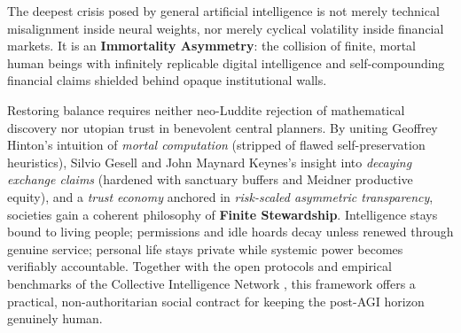 \documentclass[11pt]{article}
\begin{document}
The deepest crisis posed by general artificial intelligence is not merely technical misalignment inside neural weights, nor merely cyclical volatility inside financial markets. It is an \textbf{Immortality Asymmetry}: the collision of finite, mortal human beings with infinitely replicable digital intelligence and self-compounding financial claims shielded behind opaque institutional walls.

Restoring balance requires neither neo-Luddite rejection of mathematical discovery nor utopian trust in benevolent central planners. By uniting Geoffrey Hinton's intuition of \emph{mortal computation} (stripped of flawed self-preservation heuristics), Silvio Gesell and John Maynard Keynes's insight into \emph{decaying exchange claims} (hardened with sanctuary buffers and Meidner productive equity), and a \emph{trust economy} anchored in \emph{risk-scaled asymmetric transparency}, societies gain a coherent philosophy of \textbf{Finite Stewardship}. Intelligence stays bound to living people; permissions and idle hoards decay unless renewed through genuine service; personal life stays private while systemic power becomes verifiably accountable. Together with the open protocols and empirical benchmarks of the Collective Intelligence Network \citep{baker2026cin}, this framework offers a practical, non-authoritarian social contract for keeping the post-AGI horizon genuinely human.

\FloatBarrier
{\small
\setlength{\bibsep}{3.5pt plus 0.5pt}


}
\end{document}
